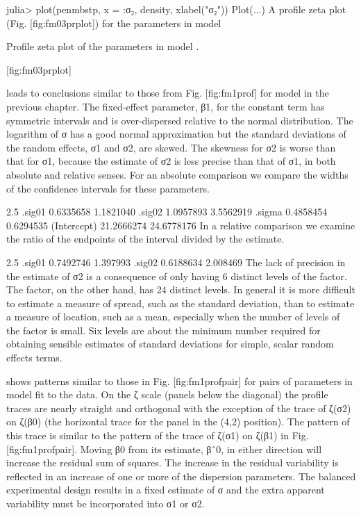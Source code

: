 julia> plot(penmbstp, x = :σ₂, density, xlabel("σ₂"))
Plot(...)
A profile zeta plot (Fig. [fig:fm03prplot]) for the parameters in model

Profile zeta plot of the parameters in model .

[fig:fm03prplot]

leads to conclusions similar to those from Fig. [fig:fm1prof] for model in the previous chapter. The fixed-effect parameter, β1, for the constant term has symmetric intervals and is over-dispersed relative to the normal distribution. The logarithm of σ has a good normal approximation but the standard deviations of the random effects, σ1 and σ2, are skewed. The skewness for σ2 is worse than that for σ1, because the estimate of σ2 is less precise than that of σ1, in both absolute and relative senses. For an absolute comparison we compare the widths of the confidence intervals for these parameters.

                     2.5 %
    .sig01       0.6335658  1.1821040
    .sig02       1.0957893  3.5562919
    .sigma       0.4858454  0.6294535
    (Intercept) 21.2666274 24.6778176
In a relative comparison we examine the ratio of the endpoints of the interval divided by the estimate.


               2.5 %
    .sig01 0.7492746 1.397993
    .sig02 0.6188634 2.008469
The lack of precision in the estimate of σ2 is a consequence of only having 6 distinct levels of the factor. The factor, on the other hand, has 24 distinct levels. In general it is more difficult to estimate a measure of spread, such as the standard deviation, than to estimate a measure of location, such as a mean, especially when the number of levels of the factor is small. Six levels are about the minimum number required for obtaining sensible estimates of standard deviations for simple, scalar random effects terms.

shows patterns similar to those in Fig. [fig:fm1profpair] for pairs of parameters in model fit to the data. On the ζ scale (panels below the diagonal) the profile traces are nearly straight and orthogonal with the exception of the trace of ζ(σ2) on ζ(β0) (the horizontal trace for the panel in the (4,2) position). The pattern of this trace is similar to the pattern of the trace of ζ(σ1) on ζ(β1) in Fig. [fig:fm1profpair]. Moving β0 from its estimate, βˆ0, in either direction will increase the residual sum of squares. The increase in the residual variability is reflected in an increase of one or more of the dispersion parameters. The balanced experimental design results in a fixed estimate of σ and the extra apparent variability must be incorporated into σ1 or σ2.

